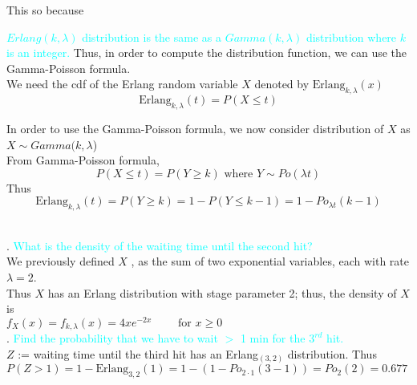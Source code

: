 \documentclass[20pt,landscape]{foils}
\newcommand{\no}{\noindent}
\begin{document}
\no This so because {\textcolor{cyan}{$Erlang(k,\lambda)$ distribution is the same as a $ Gamma(k,\lambda)$ distribution where $k$ is an integer.}
\foilhead[-.75in]{\textcolor{blue}{Erlang distribution (cont'd)}} 
\no Thus, in order to compute the distribution function, we  can use the Gamma-Poisson formula.\\[.1in] 
\no We need the cdf of the Erlang random variable $X$ denoted by $\text{Erlang}_{k,\lambda}(x)$\\[.1in]
$$\text{Erlang}_{k,\lambda}(t)= P( X \le t)$$ 

\no In order to use the Gamma-Poisson formula, we now consider distribution of $X$ as $X \sim Gamma(k,\lambda$)\\[.1in]
\no From  Gamma-Poisson formula, $$P(X \le t)=P(Y \ge k) \text{ where } Y \sim Po(\lambda t )$$  
\no Thus $$\text{Erlang}_{k,\lambda}(t)=   P(Y \ge k)=1- P(Y \le k-1)= 1-Po_{\lambda t} (k-1)   $$ 
 
 
 
\foilhead[-.8in]{\textcolor{blue}{Erlang distribution: Example}}\vspace*{1mm}
\no {\textcolor{magenta}{Hits on a web page (continued)}}\\[.1in]
\no 1. {\textcolor{cyan}{ What is the density of the waiting time until the second hit?}}\\[.1in]
\no We previously defined $X$ , as the sum of two 
exponential variables, each with rate $\lambda = 2$.\\[.1in]
\no Thus $X$ has an Erlang distribution with stage parameter 2; thus, the density of $X$ is\\[.1in]
\hspace*{1in}$f_{X}(x) = f_{k, \lambda}(x) = 4 x e^{-2 x} \qquad	\text{ for } x \ge 0$\\[.15in]
\no 2.  {\textcolor{cyan}{Find the probability that we have to wait $>$ 1 min for the $3^{rd}$ hit.}}\\[.1in]
\no $Z$ := waiting time until the third hit has an Erlang$_{(3, 2)}$ distribution. Thus\\[.1in]
$ P( Z > 1) = 1 - \text{Erlang}_{3,2}(1) = 1 - (1 - Po_{2 \cdot 1}(3 -1)) = 
    Po_{2}(2) = 0.677$\\[.15in]
\no {\textcolor{cyan}{We will come across the Erlang distribution again, when modelling the 
waiting times in queueing systems, where customers arrive with a 
Poisson rate and need exponential time to be served.}}   

}
\end{document}
